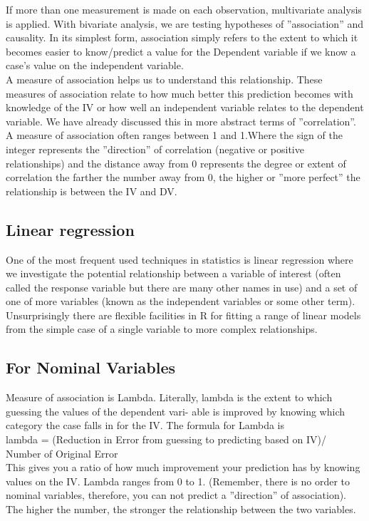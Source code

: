 If more than one measurement is made on each observation, multivariate analysis is applied.
With bivariate analysis, we are testing hypotheses of ”association” and causality. In its simplest form, association
simply refers to the extent to which it becomes easier to know/predict a value for the Dependent variable if we know
a case’s value on the independent variable. \\
A measure of association helps us to understand this relationship. These measures of association relate to how much
better this prediction becomes with knowledge of the IV or how well an independent variable relates to the dependent
variable. We have already discussed this in more abstract terms of ”correlation”. A measure of association often
ranges between 1 and 1.Where the sign of the integer represents the ”direction” of correlation (negative or positive
relationships) and the distance away from 0 represents the degree or extent of correlation the farther the number away
from 0, the higher or ”more perfect” the relationship is between the IV and DV.

\subsection{Linear regression}

One of the most frequent used techniques in statistics is linear regression where we investigate the potential relationship between a variable of interest (often called the response variable but there are many other names in use) and a set of one of more variables (known as the independent variables or some other term). Unsurprisingly there are flexible facilities in R for fitting a range of linear models from the simple case of a single variable to more complex relationships. \\

\subsection{For Nominal Variables}
Measure of association is Lambda. Literally, lambda is the extent to which guessing the values of the dependent vari-
able is improved by knowing which category the case falls in for the IV. The formula for Lambda is \\

lambda = (Reduction in Error from guessing to predicting based on IV)/ Number of Original Error \\

This gives you a ratio of how much improvement your prediction has by knowing values on the IV. Lambda ranges
from 0 to 1. (Remember, there is no order to nominal variables, therefore, you can not predict a ”direction” of
association). The higher the number, the stronger the relationship between the two variables.

